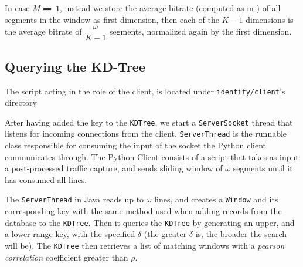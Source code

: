 In case $M$ \texttt{== 1}, instead we store the average bitrate
(computed as in ) of all segments in the window as
first dimension, then each of the $K-1$ dimensions is the average
bitrate of $\dfrac{\omega}{K-1}$ segments, normalized again by the
first dimension.

\subsection{Querying the KD-Tree}

The script acting in the role of the client, is located under
\texttt{identify/client}'s directory
\begin{small}
\end{small}

After having added the key to the \texttt{KDTree}, we start a
\texttt{ServerSocket} thread that listens for incoming connections from the
client. \texttt{ServerThread} is the runnable class responsible for consuming
the input of the socket the Python client communicates through.  The Python
Client consists of a script that takes as input a post-processed traffic
capture, and sends sliding window of $\omega$ segments until it has consumed
all lines.

The \texttt{ServerThread} in Java reads up to $\omega$ lines, and creates a
\texttt{Window} and its corresponding key with the same method used when adding
records from the database to the \texttt{KDTree}. Then it queries the
\texttt{KDTree} by generating an upper, and a lower range key, with the
specified $\delta$ (the greater $\delta$ is, the broader the search will be).
The \texttt{KDTree} then retrieves a list of matching windows with a
\emph{pearson correlation} coefficient greater than $\rho$.
